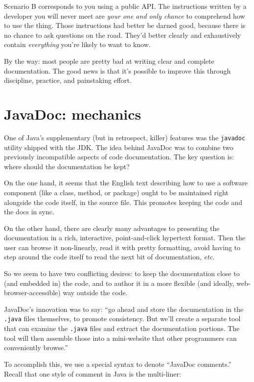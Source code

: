 Scenario B corresponds to you using a public API. The instructions written by
a developer you will never meet are \textit{your one and only chance} to
comprehend how to use the thing. Those instructions had better be darned good,
because there is no chance to ask questions on the road. They'd better clearly
and exhaustively contain \textit{everything} you're likely to want to know.

By the way: most people are pretty bad at writing clear and complete
documentation. The good news is that it's possible to improve this through
discipline, practice, and painstaking effort.

\section{JavaDoc: mechanics}

One of Java's supplementary (but in retrospect, killer) features was the
\texttt{javadoc} utility shipped with the JDK. The idea behind JavaDoc was to
combine two previously incompatible aspects of code documentation. The key
question is: where should the documentation be kept?

On the one hand, it seems that the English text describing how to use a
software component (like a class, method, or package) ought to be maintained
right alongside the code itself, in the source file. This promotes keeping the
code and the docs in sync.

On the other hand, there are clearly many advantages to presenting the
documentation in a rich, interactive, point-and-click hypertext format. Then
the user can browse it non-linearly, read it with pretty formatting, avoid
having to step around the code itself to read the next bit of documentation,
\textit{etc.} 

So we seem to have two conflicting desires: to keep the documentation close to
(and embedded in) the code, and to author it in a more flexible (and ideally,
web-browser-accessible) way outside the code.

JavaDoc's innovation was to say: ``go ahead and store the documentation in the
\texttt{.java} files themselves, to promote consistency. But we'll create a
separate tool that can examine the \texttt{.java} files and extract the
documentation portions. The tool will then assemble those into a mini-website
that other programmers can conveniently browse.''

To accomplish this, we use a special syntax to denote ``JavaDoc comments.''
Recall that one style of comment in Java is the multi-liner:

